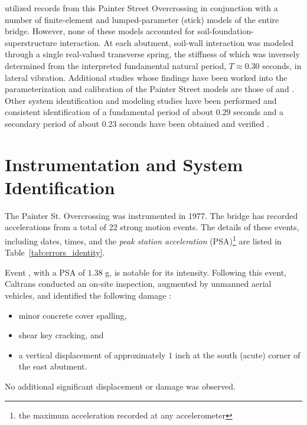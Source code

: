 \cite{maroney1990interpretation} utilized records from this Painter Street Overcrossing
in conjunction with a number of finite-element and lumped-parameter
(stick) models of the entire bridge. 
However, none of these models
accounted for soil-foundation-superstructure interaction. 
At each
abutment, soil-wall interaction was modeled through a single real-valued
transverse spring, the stiffness of which was inversely determined from the
interpreted fundamental natural period, \(T \approx 0.30\) seconds, in
lateral vibration.
Additional studies whose findings have been worked into the
parameterization and calibration of the Painter Street models are those of
\textcite{zhang2002seismic} and \textcite{arici2003system}.
%
Other system identification and modeling studies have been performed and consistent identification of a fundamental period of about 0.29 seconds and a secondary period of about 0.23 seconds have been obtained and verified \citep{fraino_seismic_2012,safak_use_1994,turek_ambient_2014,mosquera2009utilization,ventura_dynamic_nodate,mccallen1994dynamic}.


\section{Instrumentation and System Identification}

The Painter St. Overcrossing was instrumented in 1977. 
The bridge has recorded accelerations from a total of 22 strong motion events. 
The details of these events, including dates, times, and the \emph{peak station acceleration} (PSA)\footnote{the maximum acceleration recorded at any accelerometer} are listed in Table~\ref{tab:errors_identity}. 


Event , with a PSA of $1.38$ g, is notable for its intensity. 
Following this event, Caltrans conducted an on-site inspection, augmented by unmanned aerial vehicles, and identified the following damage \citep{heninger_use_2023}:
\begin{itemize}
    \item minor concrete cover spalling,
    \item shear key cracking, and
    \item a vertical displacement of approximately $1$ inch at the south (acute) corner of the east abutment.
\end{itemize}
No additional significant displacement or damage was observed.

%

